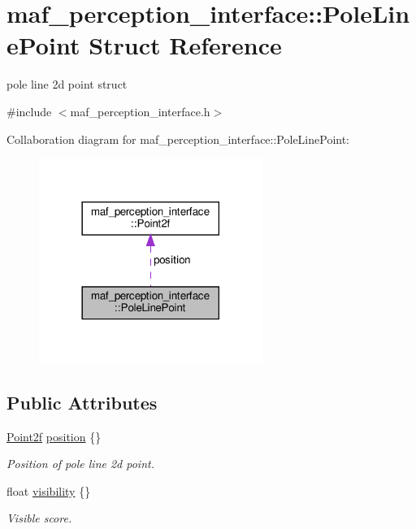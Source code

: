\hypertarget{structmaf__perception__interface_1_1PoleLinePoint}{}\section{maf\+\_\+perception\+\_\+interface\+:\+:Pole\+Line\+Point Struct Reference}
\label{structmaf__perception__interface_1_1PoleLinePoint}


pole line 2d point struct  




{\ttfamily \#include $<$maf\+\_\+perception\+\_\+interface.\+h$>$}



Collaboration diagram for maf\+\_\+perception\+\_\+interface\+:\+:Pole\+Line\+Point\+:\nopagebreak
\begin{figure}[H]
\begin{center}
\leavevmode
\includegraphics[width=206pt]{structmaf__perception__interface_1_1PoleLinePoint__coll__graph}
\end{center}
\end{figure}
\subsection*{Public Attributes}
\begin{DoxyCompactItemize}
\item 
\hyperlink{structmaf__perception__interface_1_1Point2f}{Point2f} \hyperlink{structmaf__perception__interface_1_1PoleLinePoint_a6dcbf3c04ff7264c646ed626b6e497c4}{position} \{\}
\begin{DoxyCompactList}\small\item\em Position of pole line 2d point. \end{DoxyCompactList}\item 
float \hyperlink{structmaf__perception__interface_1_1PoleLinePoint_a7cb73abaca7893b818421376ffa92901}{visibility} \{\}
\begin{DoxyCompactList}\small\item\em Visible score. \end{DoxyCompactList}\end{DoxyCompactItemize}


